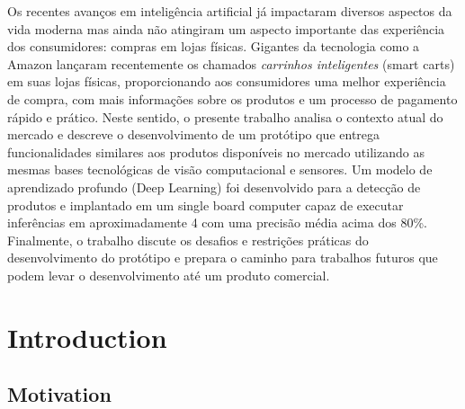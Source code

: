 \documentclass[openright]{normas-utf-tex} %
\begin{document}
\begin{resumo}

Os recentes avanços em inteligência artificial já impactaram diversos aspectos
da vida moderna mas ainda não atingiram um aspecto importante das
experiência dos consumidores: compras em lojas físicas. Gigantes da
tecnologia como a Amazon lançaram recentemente os chamados
\textit{carrinhos inteligentes} (smart carts) em suas lojas físicas,
proporcionando aos consumidores uma melhor experiência de compra, com mais
informações sobre os produtos e um processo de pagamento rápido e prático.
Neste sentido, o presente trabalho analisa o contexto atual do mercado e
descreve o desenvolvimento de um protótipo que entrega funcionalidades
similares aos produtos disponíveis no mercado utilizando as mesmas bases
tecnológicas de visão computacional e sensores. Um modelo de
aprendizado profundo (Deep Learning) foi desenvolvido para a detecção de
produtos e implantado em um single board computer capaz de executar
inferências em aproximadamente 4  com uma
precisão média acima dos 80\%. Finalmente, o trabalho discute os desafios e
restrições práticas do desenvolvimento do protótipo e prepara o caminho
para trabalhos futuros que podem levar o desenvolvimento até um produto
comercial.
\end{resumo}

\listadefiguras %
\listadetabelas %
\listadesiglas %

\sumario %
%
%
%
%

\setcounter{page}{12}

\chapter{Introduction}

\section{Motivation}
\end{document}
